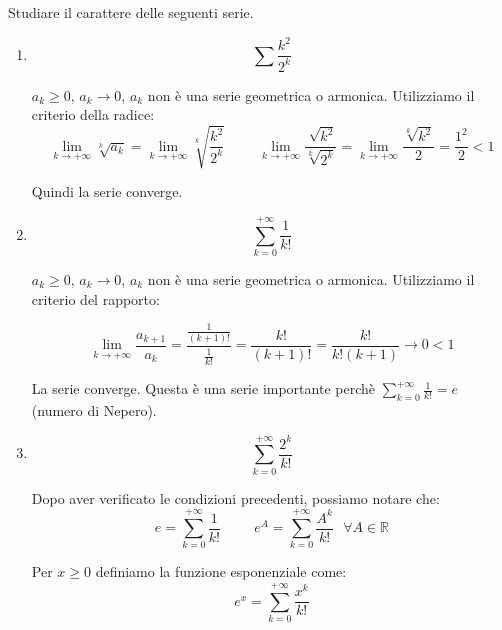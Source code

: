 \begin{exercise}
    Studiare il carattere delle seguenti serie.
    \begin{enumerate}
        \item \begin{equation*}\sum\frac{k^2}{2^k}\end{equation*}
        
        $a_k\geq0$, $a_k\to0$, $a_k$ non è una serie geometrica o armonica. Utilizziamo il criterio della radice:
        \begin{equation*}
            \lim_{k\to+\infty}\sqrt[k]{a_k}=\lim_{k\to+\infty}\sqrt[k]{\frac{k^2}{2^k}}\hspace{1cm}\lim_{k\to+\infty}\frac{\sqrt[]{k^2}}{\sqrt[k]{2^k}}=\lim_{k\to+\infty}\frac{\sqrt[k]{k^2}}{2}=\frac{1^2}{2}<1
        \end{equation*}
        
    Quindi la serie converge.
    
    
    \item \begin{equation*}\sum^{+\infty}_{k=0}\frac{1}{k!}\end{equation*}
    
    $a_k\geq0$, $a_k\to0$, $a_k$ non è una serie geometrica o armonica. Utilizziamo il criterio del rapporto:
    
    \begin{equation*}
        \lim_{k\to+\infty}\frac{a_{k+1}}{a_k}=\frac{\frac{1}{(k+1)!}}{\frac{1}{k!}}=\frac{k!}{(k+1)!}=\frac{k!}{k!(k+1)}\to0<1
    \end{equation*}
    
    La serie converge. Questa è una serie importante perchè $\sum^{+\infty}_{k=0}\frac{1}{k!}=e$ (numero di Nepero).
    
    \item \begin{equation*}\sum^{+\infty}_{k=0}\frac{2^k}{k!}\end{equation*}
    
    Dopo aver verificato le condizioni precedenti, possiamo notare che:
    \begin{equation*}
        e=\sum^{+\infty}_{k=0}\frac{1}{k!}\hspace{1cm}e^A=\sum^{+\infty}_{k=0}\frac{A^k}{k!}\text{ }\forall A\in\mathbb{R}
    \end{equation*}
    
    \begin{definition*}
        Per $x\geq0$ definiamo la funzione esponenziale come:
        \begin{equation*}e^x=\sum^{+\infty}_{k=0}\frac{x^k}{k!}\end{equation*}
    \end{definition*}
    

\end{enumerate}
\end{exercise}
